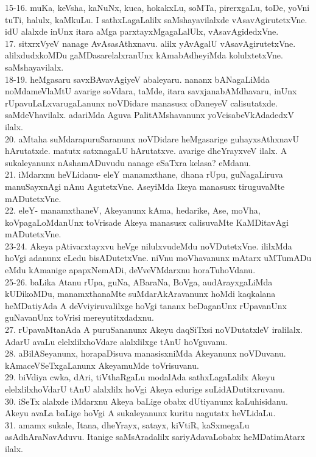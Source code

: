 \documentclass{article}
\begin{document}
15-16. muKa, keVsha, kaNuNx, kuca, hokakxLu, soMTa, pirerxgaLu, toDe, yoVni tuTi, halulx, kaMkuLu. I sathxLagaLalilx saMshayavilalxde vAsavAgirutetxVne. idU alalxde inUnx itara aMga parxtayxMgagaLalUlx, vAsavAgidedxVne.\\
17. sitxrxVyeV nanage AvAsasAthxnavu. alilx yAvAgalU vAsavAgirutetxVne. alilxdudxkoMDu gaMDasarelalxranUnx kAmabAdheyiMda kolulxtetxVne. saMshayavilalx.\\
18-19. heMgasaru savxBAvavAgiyeV abaleyaru. nananx bANagaLiMda noMdameVlaMtU avarige soVdara, taMde, itara savxjanabAMdhavaru, inUnx rUpavuLaLxvarugaLanunx noVDidare manasusx oDaneyeV calisutatxde. saMdeVhavilalx. adariMda Aguva PalitAMshavanunx yoVcisabeVkAdadedxV ilalx.\\
20. aMtaha suMdarapuruSaranunx noVDidare heMgasarige guhayxsAthxnavU hArutatxde. matutx satxnagaLU hArutatxve. avarige dheYrayxveV ilalx. A sukaleyanunx nAshamADuvudu nanage eSaTxra kelasa? eMdanu.\\
21. iMdarxnu heVLidanu- eleY manamxthane, dhana rUpu, guNagaLiruva manuSayxnAgi nAnu AgutetxVne. AseyiMda Ikeya manasusx tiruguvaMte mADutetxVne.\\
22. eleY- manamxthaneV, Akeyanunx kAma, hedarike, Ase, moVha, koVpagaLoMdanUnx toVrisade Akeya manasusx calisuvaMte KaMDitavAgi mADutetxVne.\\
23-24. Akeya pAtivarxtayxvu heVge nilulxvudeMdu noVDutetxVne. ililxMda hoVgi adanunx eLedu bisADutetxVne. niVnu moVhavanunx mAtarx uMTumADu eMdu kAmanige apapxNemADi, deVveVMdarxnu horaTuhoVdanu.\\
25-26. baLika Atanu rUpa, guNa, ABaraNa, BoVga, audArayxgaLiMda kUDikoMDu, manamxthanaMte suMdarAkAravanunx hoMdi kaqkalana heMDatiyAda A deVviyiruvalilxge hoVgi tananx beDaganUnx rUpavanUnx guNavanUnx toVrisi mereyutitxdadxnu.\\
27. rUpavaMtanAda A puruSananunx Akeyu daqSiTxsi noVDutatxleV iralilalx. AdarU avaLu elelxlilxhoVdare alalxlilxge tAnU hoVguvanu.\\
28. aBilASeyanunx, horapaDisuva manasisxniMda Akeyanunx noVDuvanu. kAmaceVSeTxgaLanunx AkeyamuMde toVrisuvanu.\\
29. biVdiya cwka, dAri, tiVthaRgaLu modalAda sathxLagaLalilx Akeyu elelxlilxhoVdarU tAnU alalxlilx hoVgi Akeya edurige suLidADutitxruvanu.\\
30. iSeTx alalxde iMdarxnu Akeya baLige obabx dUtiyanunx kaLuhisidanu. Akeyu avaLa baLige hoVgi A sukaleyanunx kuritu nagutatx heVLidaLu.\\
31. amamx sukale, Itana, dheYrayx, satayx, kiVtiR, kaSxmegaLu asAdhAraNavAduvu. Itanige saMsAradalilx sariyAdavaLobabx heMDatimAtarx ilalx.\\
\end{document}
